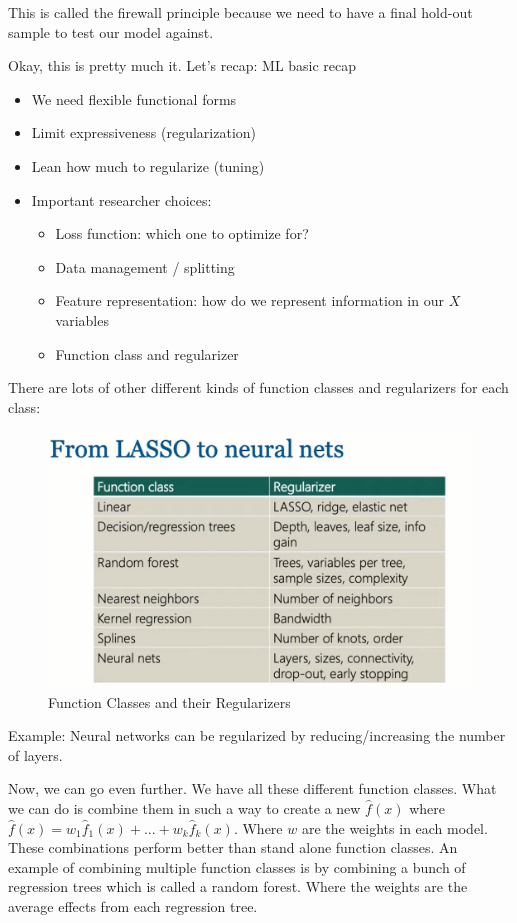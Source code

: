 \documentclass{article}
\begin{document}
This is called the firewall principle because we need to have a final hold-out sample to test our model against.

Okay, this is pretty much it. Let's recap: ML basic recap

\begin{itemize}
    \item We need flexible functional forms
    \item Limit expressiveness (regularization)
    \item Lean how much to regularize (tuning)
    \item Important researcher choices:
    \begin{itemize}
        \item Loss function: which one to optimize for?
        \item Data management / splitting
        \item Feature representation: how do we represent information in our $X$ variables
        \item Function class and regularizer
    \end{itemize}
\end{itemize}

There are lots of other different kinds of function classes and regularizers for each class:

\begin{figure}[H]
    \centering
    \includegraphics[scale = 0.3]{function_classes.png}
    \caption{Function Classes and their Regularizers}
    \label{fig:function_classes}
\end{figure}

Example: Neural networks can be regularized by reducing/increasing the number of layers.

Now, we can go even further. We have all these different function classes. What we can do is combine them in such a way to create a new $\hat{f}(x)$ where $\hat{f}(x) = w_1 \hat{f}_1(x) + ... +w_k \hat{f}_k(x)$. Where $w$ are the weights in each model. These combinations perform better than stand alone function classes. An example of combining multiple function classes is by combining a bunch of regression trees which is called a random forest. Where the weights are the average effects from each regression tree.
\end{document}
